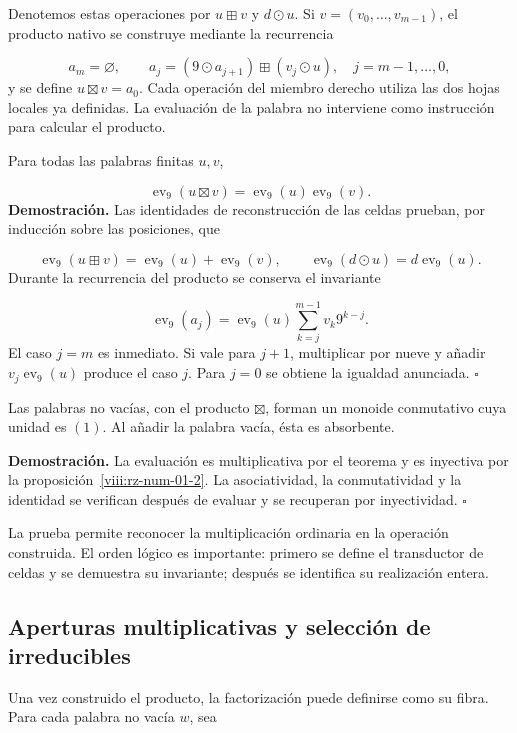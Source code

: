 Denotemos estas operaciones por $u\boxplus v$ y $d\odot u$. Si $v=(v_0,\ldots,v_{m-1})$, el producto nativo se construye mediante la recurrencia

\[
a_m=\varnothing,\qquad
a_j=(9\odot a_{j+1})\boxplus(v_j\odot u),
\quad j=m-1,\ldots,0,
\]
y se define $u\boxtimes v=a_0$. Cada operación del miembro derecho utiliza las dos hojas locales ya definidas. La evaluación de la palabra no interviene como instrucción para calcular el producto.

Para todas las palabras finitas $u,v$,

\[
\operatorname{ev}_9(u\boxtimes v)
=\operatorname{ev}_9(u)\operatorname{ev}_9(v).
\]
\textbf{Demostración.} Las identidades de reconstrucción de las celdas prueban, por inducción sobre las posiciones, que

\[
\operatorname{ev}_9(u\boxplus v)
=\operatorname{ev}_9(u)+\operatorname{ev}_9(v),\qquad
\operatorname{ev}_9(d\odot u)=d\operatorname{ev}_9(u).
\]
Durante la recurrencia del producto se conserva el invariante

\[
\operatorname{ev}_9(a_j)
=\operatorname{ev}_9(u)\sum_{k=j}^{m-1}v_k9^{k-j}.
\]
El caso $j=m$ es inmediato. Si vale para $j+1$, multiplicar por nueve y añadir $v_j\operatorname{ev}_9(u)$ produce el caso $j$. Para $j=0$ se obtiene la igualdad anunciada. \hfill\(\square\)

Las palabras no vacías, con el producto $\boxtimes$, forman un monoide conmutativo cuya unidad es $(1)$. Al añadir la palabra vacía, ésta es absorbente.

\textbf{Demostración.} La evaluación es multiplicativa por el teorema y es inyectiva por la proposición~\ref{viii:rz-num-01-2}. La asociatividad, la conmutatividad y la identidad se verifican después de evaluar y se recuperan por inyectividad. \hfill\(\square\)

La prueba permite reconocer la multiplicación ordinaria en la operación construida. El orden lógico es importante: primero se define el transductor de celdas y se demuestra su invariante; después se identifica su realización entera.

\subsection{Aperturas multiplicativas y selección de irreducibles}
Una vez construido el producto, la factorización puede definirse como su fibra. Para cada palabra no vacía $w$, sea

